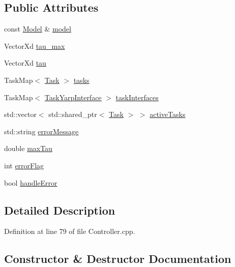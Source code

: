 \subsection*{Public Attributes}
\begin{DoxyCompactItemize}
\item 
const \hyperlink{classocra_1_1Model}{Model} \& \hyperlink{structocra_1_1Controller_1_1Pimpl_aadf5eccdc9453d1f277f62b7becf7390}{model}
\item 
Vector\+Xd \hyperlink{structocra_1_1Controller_1_1Pimpl_a19486bfe59a11231eeabfd3b2b9abd39}{tau\+\_\+max}
\item 
Vector\+Xd \hyperlink{structocra_1_1Controller_1_1Pimpl_a06e7fceb4a0a3c678a4e26fc12946e5c}{tau}
\item 
Task\+Map$<$ \hyperlink{classocra_1_1Task}{Task} $>$ \hyperlink{structocra_1_1Controller_1_1Pimpl_a246fa1cc15ad20293ef78b04dc0dbe70}{tasks}
\item 
Task\+Map$<$ \hyperlink{classocra_1_1TaskYarpInterface}{Task\+Yarp\+Interface} $>$ \hyperlink{structocra_1_1Controller_1_1Pimpl_a396836991948d8d90cf5852330d2c5c3}{task\+Interfaces}
\item 
std\+::vector$<$ std\+::shared\+\_\+ptr$<$ \hyperlink{classocra_1_1Task}{Task} $>$ $>$ \hyperlink{structocra_1_1Controller_1_1Pimpl_a721a40c7b21e230a7508995ecfa93d60}{active\+Tasks}
\item 
std\+::string \hyperlink{structocra_1_1Controller_1_1Pimpl_a1150a44bd413ec025703d53c8eaf4733}{error\+Message}
\item 
double \hyperlink{structocra_1_1Controller_1_1Pimpl_a6731e905858ef90305a3c99c605c8069}{max\+Tau}
\item 
int \hyperlink{structocra_1_1Controller_1_1Pimpl_a8a4ac972687499a277fa08dced73180c}{error\+Flag}
\item 
bool \hyperlink{structocra_1_1Controller_1_1Pimpl_a2764f0bf903a983abae8195ab6639ed5}{handle\+Error}
\end{DoxyCompactItemize}


\subsection{Detailed Description}


Definition at line 79 of file Controller.\+cpp.



\subsection{Constructor \& Destructor Documentation}
